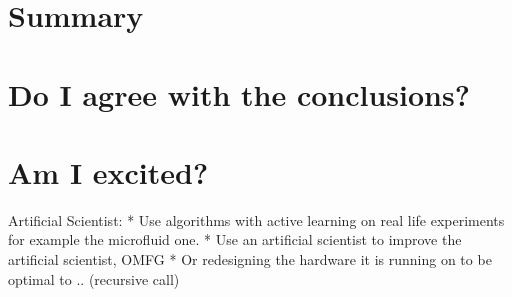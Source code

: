 \documentclass{article}
\begin{document}

\section{Summary} %

\section{Do I agree with the conclusions?}

\section{Am I excited?}

Artificial Scientist: 
* Use algorithms with active learning on real life experiments for example the
microfluid one.
* Use an artificial scientist to improve the artificial scientist, OMFG
* Or redesigning the hardware it is running on to be optimal to .. (recursive
call)
\end{document}
